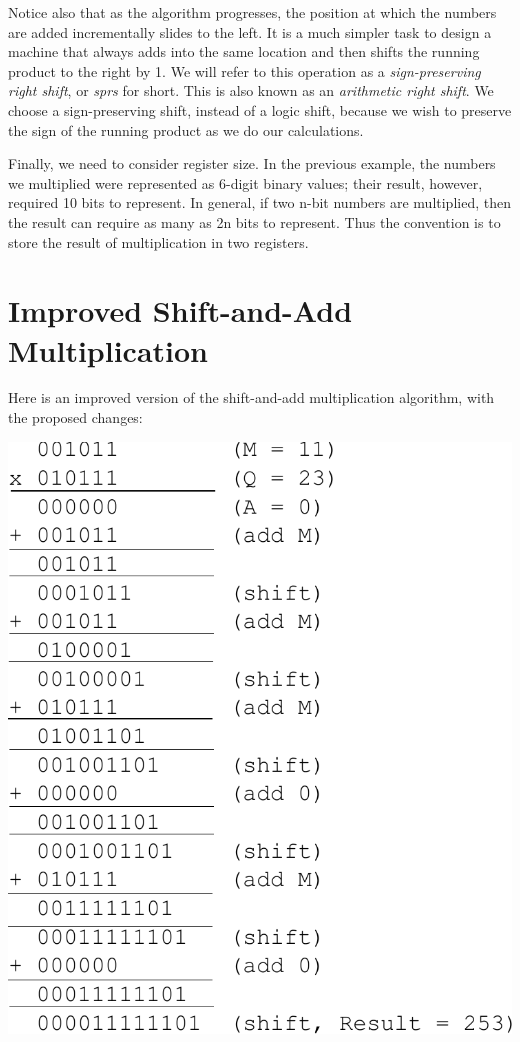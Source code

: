 \documentclass{article}
\begin{document}
Notice also that as the algorithm progresses, the position at which the numbers are added incrementally slides to the left.
It is a much simpler task to design a machine that always adds into the same location and then shifts the running product to the right by 1.
We will refer to this operation as a \emph{sign-preserving right shift}, or \emph{sprs} for short.
This is also known as an \emph{arithmetic right shift}.
We choose a sign-preserving shift, instead of a logic shift, because we wish to preserve the sign of the running product as we do our calculations.

Finally, we need to consider register size.
In the previous example, the numbers we multiplied were represented as 6-digit binary values; their result, however, required 10 bits to represent.
In general, if two n-bit numbers are multiplied, then the result can require as many as 2n bits to represent.
Thus the convention is to store the result of multiplication in two registers.

\section{Improved Shift-and-Add Multiplication}
Here is an improved version of the shift-and-add multiplication algorithm, with the proposed changes: %

\includegraphics[scale=0.7]{isaam2.pdf}
\end{document}
